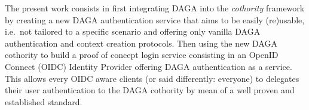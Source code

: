 
   The present work consists in first integrating DAGA into the \emph{cothority} framework
   by creating a new DAGA authentication service that aims to be easily (re)usable,
   i.e.\ not tailored to a specific scenario and offering only vanilla DAGA authentication and context creation protocols.
   Then using the new DAGA cothority to build a proof of concept login service consisting in an
   OpenID Connect (OIDC) Identity Provider offering DAGA authentication as a service.
   This allows every OIDC aware clients (or said differently: everyone) to delegates their user authentication to the DAGA cothority
   by mean of a well proven and established standard.
